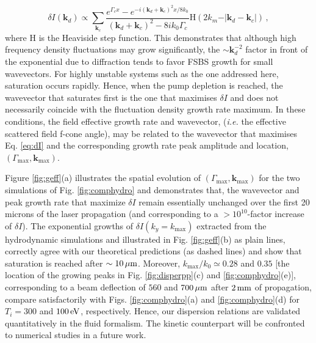 \documentclass[
 reprint,
 superscriptaddress,
 amsmath,amssymb,
 aps,
]{revtex4-1}
\begin{document}
\begin{equation}
\delta I (\mathbf{k}_d)\propto \sum_{\mathbf{k}_c} \frac{e^{\Gamma_c x} -e^{-i( \mathbf{k}_d +\mathbf{k}_c)^2x/8k_0} }{ ( \mathbf{k}_d +\mathbf{k}_c)^2 - 8ik_0\Gamma_c  } \mathrm{H}(2k_m - \vert  \mathbf{k}_d-\mathbf{k}_c \vert) \, , \label{eq:dI}
\end{equation}
where $\mathrm{H}$ is the Heaviside step function.
This demonstrates that although high frequency density fluctuations may grow significantly, the $\sim \mathbf{k}_d^{-2}$ factor in front of the exponential due to diffraction tends to favor FSBS growth for small wavevectors. 
For highly unstable systems such as the one addressed here, saturation occurs rapidly.
Hence, when the pump depletion is reached, the wavevector that saturates first is the one that maximises $\delta I$ and does not necessarily coincide with the fluctuation density growth rate maximum. 
In these conditions, the field effective growth rate and wavevector, (\emph{i.e.}
the effective scattered field f-cone angle), may be related to the wavevector that maximises Eq. \eqref{eq:dI} and the corresponding growth rate peak amplitude and location, $(\Gamma_\mathrm{max},\mathbf{k}_\mathrm{max})$.

Figure \ref{fig:geff}(a) illustrates the spatial evolution of  $(\Gamma_\mathrm{max},\mathbf{k}_\mathrm{max})$ for the two simulations of Fig. \ref{fig:comphydro} and demonstrates that,   the wavevector and peak growth rate that maximize
$\delta I$ remain essentially unchanged over the first 20 microns of the laser propagation (and corresponding to a  $>10^{10}$-factor  increase of  $\delta I$). The exponential growths of $\delta I(k_y=k_\mathrm{max})$ extracted from the hydrodynamic simulations and illustrated in Fig. \ref{fig:geff}(b) as plain lines, correctly agree with our theoretical predictions (as dashed lines) and show that   saturation is reached after $\sim 10\,\rm\mu m$.
Moreover, $k_\mathrm{max}/k_0\simeq 0.28$ and $0.35$ [the location of the growing peaks in Fig. \ref{fig:disperpp}(c) and \ref{fig:comphydro}(e)], corresponding to a beam deflection  of $560$ and $700\,\rm\mu m$ after $2\,\rm mm$ of propagation, compare satisfactorily with Figs. \ref{fig:comphydro}(a) and \ref{fig:comphydro}(d) for $T_i=300$ and $100\, \rm eV$, respectively.
Hence, our dispersion relations are validated quantitatively in the fluid formalism. The kinetic counterpart will be confronted to numerical studies in a future work.
\end{document}
